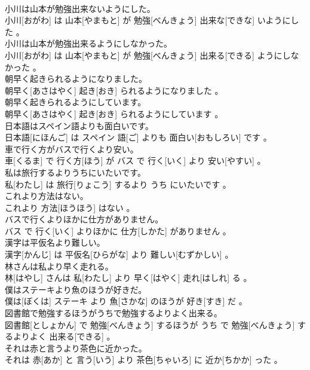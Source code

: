 \documentclass[8pt]{extreport}
\begin{document}
\begin{CJK}{UTF8}{min}
\\	小川は山本が勉強出来ないようにした。	
\\	小川[おがわ] は 山本[やまもと] が 勉強[べんきょう] 出来な[できな] いようにした 。
\\	小川は山本が勉強出来るようにしなかった。	
\\	小川[おがわ] は 山本[やまもと] が 勉強[べんきょう] 出来る[できる] ようにしなかった 。
\\	朝早く起きられるようになりました。	
\\	朝早く[あさはやく] 起き[おき] られるようになりました 。
\\	朝早く起きられるようにしています。	
\\	朝早く[あさはやく] 起き[おき] られるようにしています 。
\\	日本語はスペイン語よりも面白いです。	
\\	日本語[にほんご] は スペイン 語[ご] よりも 面白い[おもしろい] です 。
\\	車で行く方がバスで行くより安い。	
\\	車[くるま] で 行く方[ほう] が バス で 行く[いく] より 安い[やすい] 。
\\	私は旅行するよりうちにいたいです。	
\\	私[わたし] は 旅行[りょこう] するより うち にいたいです 。
\\	これより方法はない。	
\\	これより 方法[ほうほう] はない 。
\\	バスで行くよりほかに仕方がありません。	
\\	バス で 行く[いく] よりほかに 仕方[しかた] がありません 。
\\	漢字は平仮名より難しい。	
\\	漢字[かんじ] は 平仮名[ひらがな] より 難しい[むずかしい] 。
\\	林さんは私より早く走れる。	
\\	林[はやし] さんは 私[わたし] より 早く[はやく] 走れ[はしれ] る 。
\\	僕はステーキより魚のほうが好きだ。	
\\	僕は[ぼくは] ステーキ より 魚[さかな] のほうが 好き[すき] だ 。
\\	図書館で勉強するほうがうちで勉強するよりよく出来る。	
\\	図書館[としょかん] で 勉強[べんきょう] するほうが うち で 勉強[べんきょう] するよりよく 出来る[できる] 。
\\	それは赤と言うより茶色に近かった。	
\\	それは 赤[あか] と 言う[いう] より 茶色[ちゃいろ] に 近か[ちかか] った 。

\end{CJK}
\end{document}
